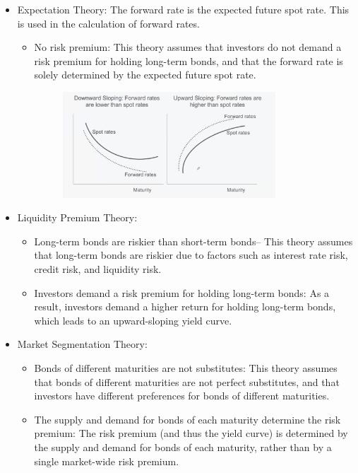\begin{itemize}
    \item Expectation Theory: The forward rate is the expected future spot rate. This is used in the calculation of forward rates.
    \begin{itemize}
                \item No risk premium: This theory assumes that investors do not demand a risk premium for holding long-term bonds, and that the forward rate is solely determined by the expected future spot rate.
                \begin{figure}[H]
                    \centering
                    \includegraphics[width=0.8\textwidth]{img/2.5.png}
                \end{figure}
                \end{itemize}
    \item Liquidity Premium Theory:
    \begin{itemize}
                \item Long-term bonds are riskier than short-term bonds– This theory assumes that long-term bonds are riskier due to factors such as interest rate risk, credit risk, and liquidity risk.
                \item Investors demand a risk premium for holding long-term bonds: As a result, investors demand a higher return for holding long-term bonds, which leads to an upward-sloping yield curve.

    \end{itemize}
    \item Market Segmentation Theory:
    \begin{itemize}
                \item Bonds of different maturities are not substitutes: This theory assumes that bonds of different maturities are not perfect substitutes, and that investors have different preferences for bonds of different maturities.
                \item The supply and demand for bonds of each maturity determine the risk premium: The risk premium (and thus the yield curve) is determined by the supply and demand for bonds of each maturity, rather than by a single market-wide risk premium.
    \end{itemize}
\end{itemize}

